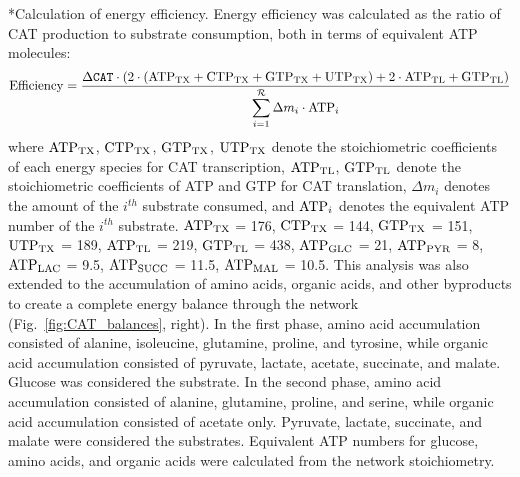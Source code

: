 \documentclass[12pt]{article}
\makeatletter
\renewcommand\subsection{\@startsection
	{subsection}{2}{0mm}
	{-0.05in}
	{-0.5\baselineskip}
	{\normalfont\normalsize\bfseries}}
\makeatother
\begin{document}
\subsection*{Calculation of energy efficiency.}
Energy efficiency was calculated as the ratio of CAT production to substrate consumption, both in terms of equivalent ATP molecules:
\begin{equation}\label{eqn:energy-efficiency-definition}
	{\rm Efficiency}=\frac{\Delta\texttt{CAT}\cdot \left(2\cdot\left(\rm {ATP}_{TX}+\rm {CTP}_{TX}+\rm {GTP}_{TX}+\rm {UTP}_{TX}\right)+\rm2\cdot\rm {ATP}_{TL}+\rm {GTP}_{TL}\right)}{\displaystyle\sum_{i=1}^{\mathcal{R}}\Delta m_{i}\cdot {\rm ATP}_i}
\end{equation}
where $\rm {ATP}_{TX}$, $\rm {CTP}_{TX}$, $\rm {GTP}_{TX}$, $\rm {UTP}_{TX}$ denote the stoichiometric coefficients of each energy species for CAT transcription, $\rm {ATP}_{TL}$, $\rm {GTP}_{TL}$ denote the stoichiometric coefficients of ATP and GTP for CAT translation, $\Delta m_{i}$ denotes the amount of the $i^{th}$ substrate consumed, and ${\rm ATP}_i$ denotes the equivalent ATP number of the $i^{th}$ substrate.
$\rm {ATP}_{TX}$ = 176, $\rm {CTP}_{TX}$ = 144, $\rm {GTP}_{TX}$ = 151, $\rm {UTP}_{TX}$ = 189, $\rm {ATP}_{TL}$ = 219, $\rm {GTP}_{TL}$ = 438, $\rm {ATP}_{GLC}$ = 21, $\rm {ATP}_{PYR}$ = 8, $\rm {ATP}_{LAC}$ = 9.5, $\rm {ATP}_{SUCC}$ = 11.5, $\rm {ATP}_{MAL}$ = 10.5.
This analysis was also extended to the accumulation of amino acids, organic acids, and other byproducts to create a complete energy balance through the network (Fig.~\ref{fig:CAT_balances}, right).
In the first phase, amino acid accumulation consisted of alanine, isoleucine, glutamine, proline, and tyrosine, while organic acid accumulation consisted of pyruvate, lactate, acetate, succinate, and malate.
Glucose was considered the substrate.
In the second phase, amino acid accumulation consisted of alanine, glutamine, proline, and serine, while organic acid accumulation consisted of acetate only.
Pyruvate, lactate, succinate, and malate were considered the substrates.
Equivalent ATP numbers for glucose, amino acids, and organic acids were calculated from the network stoichiometry.
\end{document}
